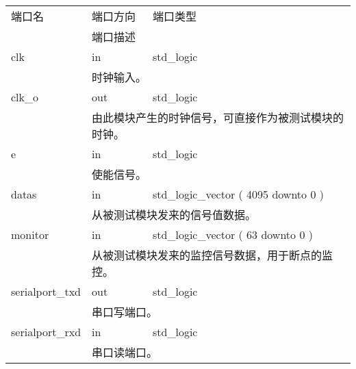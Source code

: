         \begin{tabularx}{\textwidth}{lll}
            \toprule
            端口名          & 端口方向  & 端口类型 \\
            \cmidrule(l){2-3}
            &
            \multicolumn{2}{X}{端口描述} \\
            \midrule
            clk             & in        & std\_logic \\
            \cmidrule(l){2-3}
            &
            \multicolumn{2}{X}{
                时钟输入。
            } \\
            \midrule
            clk\_o             & out        & std\_logic \\
            \cmidrule(l){2-3}
            &
            \multicolumn{2}{X}{
                由此模块产生的时钟信号，可直接作为被测试模块的时钟。
            } \\
            \midrule
            e             & in        & std\_logic \\
            \cmidrule(l){2-3}
            &
            \multicolumn{2}{X}{
                使能信号。
            } \\
            \midrule
            datas             & in        & std\_logic\_vector ( 4095 downto 0 ) \\
            \cmidrule(l){2-3}
            &
            \multicolumn{2}{X}{
                从被测试模块发来的信号值数据。
            } \\
            \midrule
            monitor             & in        & std\_logic\_vector ( 63 downto 0 ) \\
            \cmidrule(l){2-3}
            &
            \multicolumn{2}{X}{
                从被测试模块发来的监控信号数据，用于断点的监控。
            } \\
            \midrule
            serialport\_txd        & out      & std\_logic \\
            \cmidrule(l){2-3}
            &
            \multicolumn{2}{X}{
                串口写端口。
            } \\
            \midrule
            serialport\_rxd             & in        & std\_logic \\
            \cmidrule(l){2-3}
            &
            \multicolumn{2}{X}{
                串口读端口。
            } \\
            \bottomrule
        \end{tabularx}
